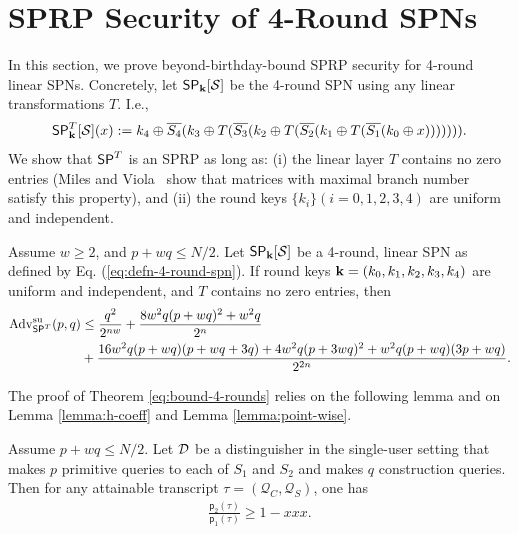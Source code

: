 
\section{SPRP Security of 4-Round SPNs}
\label{section:security of 4-round SPNs}

In this section, we prove beyond-birthday-bound SPRP security for 4-round linear SPNs. Concretely, let $\mathsf{SP}_{\mathbf{k}}[\mathcal{S}]$ be the 4-round SPN using any linear transformations $T$. I.e.,
%
\begin{align}
\mathsf{SP}_{\mathbf{k}}^T[\mathcal{S}](x):=k_4\oplus\overline{S_4}(k_3\oplus T(\overline{S_3}(k_2\oplus T(\overline{S_2}(k_1\oplus T(\overline{S_1}(k_0\oplus x))))))).
\label{eq:defn-4-round-spn}
\end{align}
%
We show that $\mathsf{SP}^T$ is an SPRP as long as: (i) the linear layer $T$ contains no zero entries (Miles and Viola~\cite{miles2015substitution} show that matrices with maximal branch number~\cite{daemen1995cipher} satisfy this property), and (ii) the round keys $\{k_i\}(i=0, 1, 2, 3, 4)$ are uniform and independent.


\begin{theorem}
\label{theorem:4-round-spn}

Assume $w\geq2$, and $p+wq\leq N/2$. Let $\mathsf{SP}_{\mathbf{k}}[\mathcal{S}]$ be a 4-round, linear SPN as defined by Eq. (\ref{eq:defn-4-round-spn}). If round keys $\mathbf{k}=(k_0,k_1,k_2,k_3,k_4)$ are uniform and independent, and $T$ contains no zero entries, then
%
\begin{align}
\operatorname{Adv}_{\mathsf{SP}^T}^{\mathrm{su}}(p, q) &\leq \frac{q^2}{2^{n w}} + \frac{8 w^2 q(p+wq)^2+w^2 q}{2^n}\\
&+ \frac{16 w^2 q(p+w q)(p+w q +3 q)+4 w^2 q(p+3 wq)^2+ w^2q(p+w q)(3p+w q)}{2^{2 n}}.
\label{eq:bound-4-rounds}
\end{align}
\end{theorem}
The proof of Theorem \ref{eq:bound-4-rounds} relies on the following lemma and on Lemma \ref{lemma:h-coeff} and Lemma \ref{lemma:point-wise}.


\begin{lemma}
	\label{lemma:proximity-4-round}
	
	Assume $p+wq\leq N/2$. Let $\mathcal{D}$ be a distinguisher in the single-user setting that makes $p$ primitive queries to each of $S_1$ and $S_2$ and makes $q$ construction queries. Then for any attainable
	transcript $\tau=(\mathcal{Q}_C,\mathcal{Q}_S)$, one has
	\begin{align}
	\frac{\mathsf{p}_{2}(\tau)}{\mathsf{p}_{1}(\tau)}
	\geq 1 - xxx.
	\label{eq:bound-proximity-4-round}
	\end{align}
\end{lemma}




